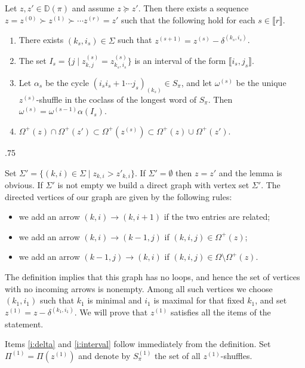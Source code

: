 \documentclass[11pt,fleqn]{amsart}
\makeatletter
\renewcommand\proofname{Proof}
\renewenvironment{proof}[1][\textit{\proofname}]{\par
 \pushQED{\qed}%
 \normalfont \topsep.75\paraskip\relax
 \trivlist
 \item[\hskip\labelsep
 \itshape
 #1\@addpunct{.}]\ignorespaces
}{%
 \popQED\endtrivlist\@endpefalse
}
\newcounter{para}[section]
\renewcommand\to{\longrightarrow}
\newcommand\interval[1]{\llbracket #1 \rrbracket}
\newcommand\Desc[1]{\mathbb D(#1)}
\makeatother
\begin{document}
\begin{Lemma*}
Let $z, z' \in \Desc{\pi}$ and assume $z \succeq z'$. Then there exists a 
sequence $z = z^{(0)} \succ z^{(1)} \succ \cdots z^{(r)} = z'$ such that the 
following hold for each $s \in \interval r$.
\begin{enumerate}
\item 
\label{i:delta}
There exists $(k_s, i_s) \in \Sigma$ such that $z^{(s+1)} = z^{(s)} - 
\delta^{(k_s, i_s)}$.

\item 
\label{i:interval}
The set $I_s = \{j \mid z^{(s)}_{k,j} = z^{(s)}_{k_s, i_s}\}$ is an interval 
of the form $\interval{i_s,j_s}$. 

\item 
\label{i:longest}
Let $\alpha_s$ be the cycle $(i_s i_s+1 \cdots j_s)_{(k_s)} \in S_\pi$, and
let $\omega^{(s)}$ be the unique $z^{(s)}$-shuffle in the coclass of the
longest word of $S_\pi$. Then $\omega^{(s)} = \omega^{(s-1)} \alpha(I_s)$.

\item 
\label{i:omega}
$\Omega^+(z) \cap \Omega^+(z') \subset \Omega^+(z^{(s)}) \subset \Omega^+(z) 
\cup \Omega^+(z')$.
\end{enumerate}
\end{Lemma*}
\begin{proof}
Set $\Sigma' = \{(k,i) \in \Sigma \mid z_{k,i} > z'_{k,i}\}$. If $\Sigma' =
\emptyset$ then $z = z'$ and the lemma is obvious. If $\Sigma'$ is not empty
we build a direct graph with vertex set $\Sigma'$. The directed vertices of
our graph are given by the following rules:
\begin{itemize}
\item we add an arrow $(k,i) \to (k,i+1)$ if the two entries are related;

\item we add an arrow $(k,i) \to (k-1,j)$ if $(k,i,j) \in \Omega^+(z)$;

\item we add an arrow $(k-1,j) \to (k,i)$ if $(k,i,j) \in \Omega \setminus 
\Omega^+(z)$.
\end{itemize}
The definition implies that this graph has no loops, and hence the set of 
vertices with no incoming arrows is nonempty. Among all such vertices we choose
$(k_1, i_1)$ such that $k_1$ is minimal and $i_1$ is maximal for that fixed 
$k_1$, and set $z^{(1)} = z - \delta^{(k_1, i_1)}$. We will prove that
$z^{(1)}$ satisfies all the items of the statement.

Items \ref{i:delta} and \ref{i:interval} follow immediately from the
definition. Set $\Pi^{(1)} = \Pi(z^{(1)})$ and denote by $S_\pi^{(1)}$ the
set of all $z^{(1)}$-shuffles. 
\end{proof}

\begin{bibdiv}
\begin{biblist}
\end{biblist}
\end{bibdiv}
\end{document}
